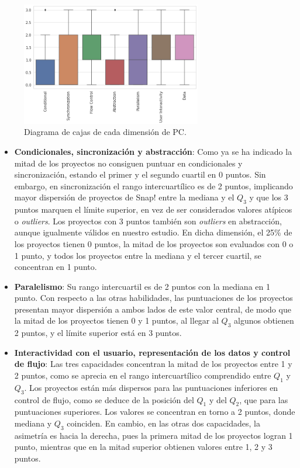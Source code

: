 \documentclass[a4paper, 12pt]{book}
\begin{document}
\begin{figure}[H]
    \centering
    \includegraphics[width=0.7\textwidth]{img/diag_cajas_Snap.png}
    \caption{Diagrama de cajas de cada dimensión de PC.}
    \label{fig:cajas_Snap}
\end{figure}

\begin{itemize}
    \item \textbf{Condicionales, sincronización y abstracción}: Como ya se ha indicado la mitad de los proyectos no consiguen puntuar en condicionales y sincronización, estando el primer y el segundo cuartil en 0 puntos. Sin embargo, en sincronización el rango intercuartílico es de 2 puntos, implicando mayor dispersión de proyectos de Snap! entre la mediana y el $Q_3$ y que los 3 puntos marquen el límite superior, en vez de ser considerados valores atípicos o \emph{outliers}. Los proyectos con 3 puntos también son \emph{outliers} en abstracción, aunque igualmente válidos en nuestro estudio. En dicha dimensión, el 25\% de los proyectos tienen 0 puntos, la mitad de los proyectos son evaluados con 0 o 1 punto, y todos los proyectos entre la mediana y el tercer cuartil, se concentran en 1 punto. %
    \item \textbf{Paralelismo}: Su rango intercuartil es de 2 puntos con la mediana en 1 punto. Con respecto a las otras habilidades, las puntuaciones de los proyectos presentan mayor dispersión a ambos lados de este valor central, de modo que la mitad de los proyectos tienen 0 y 1 puntos, al llegar al $Q_3$ algunos obtienen 2 puntos, y el límite superior está en 3 puntos.
    \item \textbf{Interactividad con el usuario, representación de los datos y control de flujo}: Las tres capacidades concentran la mitad de los proyectos entre 1 y 2 puntos, como se aprecia en el rango intercuartílico comprendido entre $Q_1$ y $Q_3$. Los proyectos están más dispersos para las puntuaciones inferiores en control de flujo, como se deduce de la posición del $Q_1$ y del $Q_2$, que para las puntuaciones superiores. Los valores se concentran en torno a 2 puntos, donde mediana y $Q_3$ coinciden. En cambio, en las otras dos capacidades, la asimetría es hacia la derecha, pues la primera mitad de los proyectos logran 1 punto, mientras que en la mitad superior obtienen valores entre 1, 2 y 3 puntos.
\end{itemize}
\end{document}

